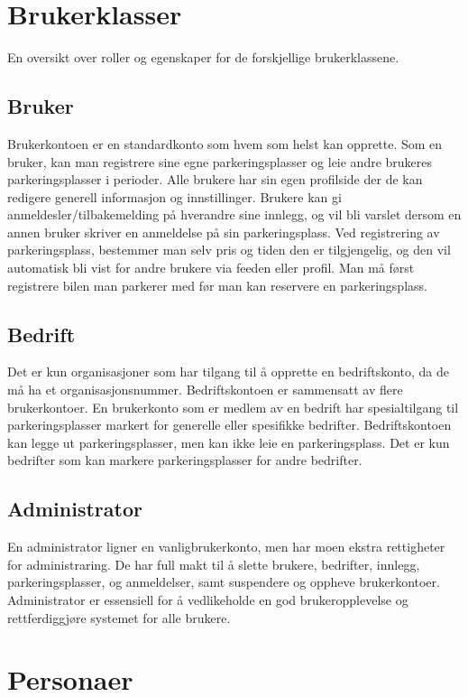 \documentclass[12pt]{article}
\begin{document}
\section{Brukerklasser}
En oversikt over roller og egenskaper for de forskjellige brukerklassene.

    \subsection{Bruker}
    Brukerkontoen er en standardkonto som hvem som helst kan opprette. Som en bruker, kan man registrere sine egne parkeringsplasser og leie andre brukeres parkeringsplasser i perioder. Alle brukere har sin egen profilside der de kan redigere generell informasjon og innstillinger. Brukere kan gi anmeldesler/tilbakemelding på hverandre sine innlegg, og vil bli varslet dersom en annen bruker skriver en anmeldelse på sin parkeringsplass. Ved registrering av parkeringsplass, bestemmer man selv pris og tiden den er tilgjengelig, og den vil automatisk bli vist for andre brukere via feeden eller profil. Man må først registrere bilen man parkerer med før man kan reservere en parkeringsplass.

    \subsection{Bedrift}
    Det er kun organisasjoner som har tilgang til å opprette en bedriftskonto, da de må ha et organisasjonsnummer. Bedriftskontoen er sammensatt av flere brukerkontoer. En brukerkonto som er medlem av en bedrift har spesialtilgang til parkeringsplasser markert for generelle eller spesifikke bedrifter. Bedriftskontoen kan legge ut parkeringsplasser, men kan ikke leie en parkeringsplass. Det er kun bedrifter som kan markere parkeringsplasser for andre bedrifter.

    \subsection{Administrator}
    En administrator ligner en vanligbrukerkonto, men har moen ekstra rettigheter for administraring. De har full makt til å slette brukere, bedrifter, innlegg, parkeringsplasser, og anmeldelser, samt suspendere og oppheve brukerkontoer. Administrator er essensiell for å vedlikeholde en god brukeropplevelse og rettferdiggjøre systemet for alle brukere.

\section{Personaer}
\end{document}
